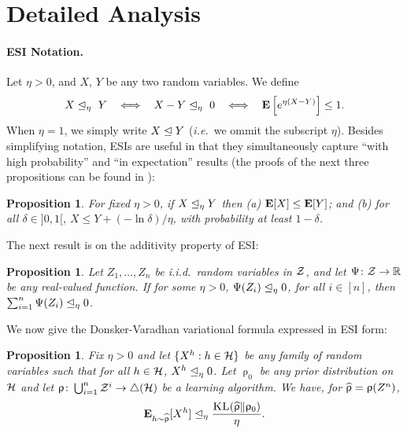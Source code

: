 \documentclass{article}
\newcommand{\ro}{\uprho}
\newcommand{\hro}{\what{\uprho}}
\newtheorem{proposition}[theorem]{Proposition}
\begin{document}
\section{Detailed Analysis}
\paragraph{ESI Notation.} Let $\eta>0$, and $X$, $Y$ be any two random variables. We define
	\begin{align}\label{eq:esi}
	X \stochleq_{\eta} \  Y  \ \ \iff \ \ X -Y\stochleq_{\eta} \  0  \ \ \iff \ \ \E \left[e^{\eta (X- Y)} \right] \leq 1.
	\end{align}
When $\eta=1$, we simply write $X \trianglelefteq Y$ (\emph{i.e.}~we ommit the subscript $\eta$). Besides simplifying notation, ESIs are useful in that they  simultaneously capture ``with high probability'' and ``in expectation'' results (the proofs of the next three propositions can be found in \citep{mhammedi2019pac}):
\begin{proposition} \label{prop:drop} 
	For fixed $\eta > 0$, if $X \trianglelefteq_{\eta} Y$ then (a) $\mathbf{E} [X] \leq \mathbf{E}[Y]$; and (b) for all $\delta \in]0,1[$, $X\leq Y + (-\ln \delta)/ \eta$, with probability at least $1-\delta$.
\end{proposition}
The next result is on the additivity property of ESI: 
\begin{proposition}\label{prop:Trans} 
 Let $Z_1, \ldots, Z_n$ be i.i.d.~random variables in $\mathcal Z$, and let $\Psi \colon \mathcal Z \rightarrow {\mathbb R}$ be any real-valued function. If for some $\eta>0$, $\Psi(Z_i) \trianglelefteq_\eta 0$, for all $i \in [n]$, then $\sum_{i=1}^n \Psi(Z_i) \trianglelefteq_{\eta} 0$.
\end{proposition}
We now give the Donsker-Varadhan variational formula expressed in ESI form: \begin{proposition} \label{prop:donsker}
	Fix $\eta > 0$ and let $\{X^h: h \in \mathcal H\}$ be any family of random variables such that for all $h \in \mathcal H$, $X^h \trianglelefteq_{\eta} 0$. Let $\ro_0$ be any prior distribution on $\mathcal H$ and let $\ro \colon \bigcup_{i=1}^n \cZ^{i} \rightarrow \triangle(\cH)$ be a learning algorithm.  We have, for $\hro = \ro(Z^n)$,
	\begin{align} \E_{h \sim \hro}[X^{h}] \stochleq_{\eta} \frac{\KL(\hro \| \ro_0)}{\eta}. \label{eq:PACBayes} \end{align} 
\end{proposition}
\end{document}
